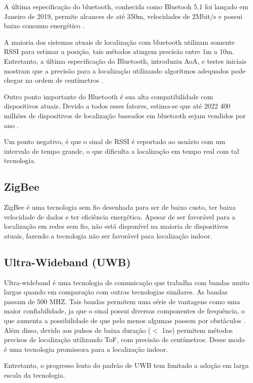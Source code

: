 A última especificação do bluetooth, conhecida como Bluetooh 5.1 foi lançado em Janeiro de 2019, permite alcances de até 350m, velocidades de 2Mbit/s e possui baixo consumo energético \cite{art8}.

A maioria dos sistemas atuais de localização com bluetooth utilizam somente RSSI para estimar a posição, tais métodos atingem precisão entre 1m a 10m. Entretanto, a última especificação do Bluetooth, introduziu AoA, e testes iniciais mostram que a precisão para a localização utilizando algoritmos adequados pode chegar na ordem de centímetros \cite{art9}.

Outro ponto importante do Bluetooth é sua alta compatibilidade com dispositivos atuais. Devido a todos esses fatores, estima-se que até 2022 400 milhões de dispositivos de localização baseados em bluetooth sejam vendidos por ano \cite{art9}.

Um ponto negativo, é que o sinal de RSSI é reportado ao usuário com um intervalo de tempo grande, o que dificulta a localização em tempo real com tal tecnologia.

\subsection{ZigBee}

ZigBee é uma tecnologia sem fio desenhada para ser de baixo custo, ter baixa velocidade de dados e ter eficiência energética. Apesar de ser favorável para a localização em redes sem fio, não está disponível na maioria de dispositivos atuais, fazendo a tecnologia não ser favorável para localização indoor. \cite{art2}

\subsection{Ultra-Wideband (UWB)}
Ultra-wideband é uma tecnologia de comunicação que trabalha com bandas muito largas quando em comparação com outras tecnologias similares. As bandas passam de 500 MHZ. Tais bandas permitem uma série de vantagens como uma maior confiabilidade, ja que o sinal possui diversas componentes de frequência, o que aumenta a possibilidade de que pelo menos algumas passem por obstáculos \cite{art10}.
Além disso, devido aos pulsos de baixa duração (\(<\) 1ns) permitem métodos precisos de localização utilizando ToF, com precisão de centímetros. Desse modo é uma tecnologia promissora para a localização indoor.

Entretanto, o progresso lento do padrão de UWB tem limitado a adoção em larga escala da tecnologia.


